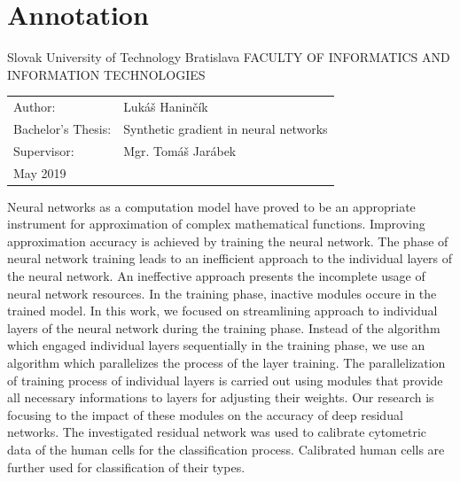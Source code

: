 \documentclass[12pt, twoside]{book}
\newcommand{\itab}[1]{\hspace{0em}\rlap{#1}}
\newcommand{\tab}[1]{\hspace{.31\textwidth}\rlap{#1}}
\begin{document}
\section*{Annotation}
Slovak University of Technology Bratislava
\newline
FACULTY OF INFORMATICS AND INFORMATION TECHNOLOGIES
\newline
\itab{Degree course:}    \tab{Informatics}
\begin{table}[h!]
\renewcommand{\arraystretch}{1.4}
\begin{tabular}{@{}p{45mm}l}
Author: & Lukáš Haninčík \\
Bachelor’s Thesis: & Synthetic gradient in neural networks \\
Supervisor: & Mgr. Tomáš Jarábek \\
May 2019
\end{tabular}
\end{table}
\newline
\newline
Neural networks as a computation model have proved to be an appropriate instrument for approximation of complex mathematical functions. Improving approximation accuracy is achieved by training the neural network. The phase of neural network training leads to an inefficient approach to the individual layers of the neural network. An ineffective approach presents the incomplete usage of neural network resources. In the training phase, inactive modules occure in the trained model. In this work, we focused on streamlining approach to individual layers of the neural network during the training phase. Instead of the algorithm which engaged individual layers sequentially in the training phase, we use an algorithm which parallelizes the process of the layer training. The parallelization of training process of individual layers is carried out using modules that provide all necessary informations to layers for adjusting their weights. Our research is focusing to the impact of these modules on the accuracy of deep residual networks. The investigated residual network was used to calibrate cytometric data of the human cells for the classification process. Calibrated human cells are further used for classification of their types.

\newpage 
\afterpage{\null\thispagestyle{empty}\newpage}

%
%
\end{document}
